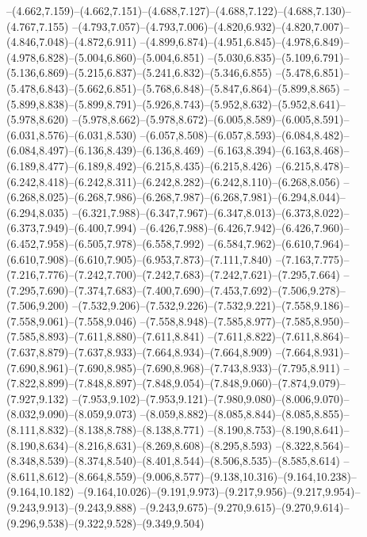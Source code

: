   --(4.662,7.159)--(4.662,7.151)--(4.688,7.127)--(4.688,7.122)--(4.688,7.130)--(4.767,7.155)%
  --(4.793,7.057)--(4.793,7.006)--(4.820,6.932)--(4.820,7.007)--(4.846,7.048)--(4.872,6.911)%
  --(4.899,6.874)--(4.951,6.845)--(4.978,6.849)--(4.978,6.828)--(5.004,6.860)--(5.004,6.851)%
  --(5.030,6.835)--(5.109,6.791)--(5.136,6.869)--(5.215,6.837)--(5.241,6.832)--(5.346,6.855)%
  --(5.478,6.851)--(5.478,6.843)--(5.662,6.851)--(5.768,6.848)--(5.847,6.864)--(5.899,8.865)%
  --(5.899,8.838)--(5.899,8.791)--(5.926,8.743)--(5.952,8.632)--(5.952,8.641)--(5.978,8.620)%
  --(5.978,8.662)--(5.978,8.672)--(6.005,8.589)--(6.005,8.591)--(6.031,8.576)--(6.031,8.530)%
  --(6.057,8.508)--(6.057,8.593)--(6.084,8.482)--(6.084,8.497)--(6.136,8.439)--(6.136,8.469)%
  --(6.163,8.394)--(6.163,8.468)--(6.189,8.477)--(6.189,8.492)--(6.215,8.435)--(6.215,8.426)%
  --(6.215,8.478)--(6.242,8.418)--(6.242,8.311)--(6.242,8.282)--(6.242,8.110)--(6.268,8.056)%
  --(6.268,8.025)--(6.268,7.986)--(6.268,7.987)--(6.268,7.981)--(6.294,8.044)--(6.294,8.035)%
  --(6.321,7.988)--(6.347,7.967)--(6.347,8.013)--(6.373,8.022)--(6.373,7.949)--(6.400,7.994)%
  --(6.426,7.988)--(6.426,7.942)--(6.426,7.960)--(6.452,7.958)--(6.505,7.978)--(6.558,7.992)%
  --(6.584,7.962)--(6.610,7.964)--(6.610,7.908)--(6.610,7.905)--(6.953,7.873)--(7.111,7.840)%
  --(7.163,7.775)--(7.216,7.776)--(7.242,7.700)--(7.242,7.683)--(7.242,7.621)--(7.295,7.664)%
  --(7.295,7.690)--(7.374,7.683)--(7.400,7.690)--(7.453,7.692)--(7.506,9.278)--(7.506,9.200)%
  --(7.532,9.206)--(7.532,9.226)--(7.532,9.221)--(7.558,9.186)--(7.558,9.061)--(7.558,9.046)%
  --(7.558,8.948)--(7.585,8.977)--(7.585,8.950)--(7.585,8.893)--(7.611,8.880)--(7.611,8.841)%
  --(7.611,8.822)--(7.611,8.864)--(7.637,8.879)--(7.637,8.933)--(7.664,8.934)--(7.664,8.909)%
  --(7.664,8.931)--(7.690,8.961)--(7.690,8.985)--(7.690,8.968)--(7.743,8.933)--(7.795,8.911)%
  --(7.822,8.899)--(7.848,8.897)--(7.848,9.054)--(7.848,9.060)--(7.874,9.079)--(7.927,9.132)%
  --(7.953,9.102)--(7.953,9.121)--(7.980,9.080)--(8.006,9.070)--(8.032,9.090)--(8.059,9.073)%
  --(8.059,8.882)--(8.085,8.844)--(8.085,8.855)--(8.111,8.832)--(8.138,8.788)--(8.138,8.771)%
  --(8.190,8.753)--(8.190,8.641)--(8.190,8.634)--(8.216,8.631)--(8.269,8.608)--(8.295,8.593)%
  --(8.322,8.564)--(8.348,8.539)--(8.374,8.540)--(8.401,8.544)--(8.506,8.535)--(8.585,8.614)%
  --(8.611,8.612)--(8.664,8.559)--(9.006,8.577)--(9.138,10.316)--(9.164,10.238)--(9.164,10.182)%
  --(9.164,10.026)--(9.191,9.973)--(9.217,9.956)--(9.217,9.954)--(9.243,9.913)--(9.243,9.888)%
  --(9.243,9.675)--(9.270,9.615)--(9.270,9.614)--(9.296,9.538)--(9.322,9.528)--(9.349,9.504)%
